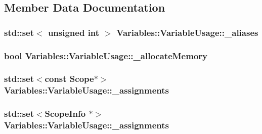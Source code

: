 \subsection{Member Data Documentation}
\hypertarget{class_variables_1_1_variable_usage_affb574d671d4bd26157faac587931e3c}{
\subsubsection[{\-\_\-aliases}]{\setlength{\rightskip}{0pt plus 5cm}std\-::set$<$ unsigned int $>$ Variables\-::\-Variable\-Usage\-::\-\_\-aliases}}\label{class_variables_1_1_variable_usage_affb574d671d4bd26157faac587931e3c}
\hypertarget{class_variables_1_1_variable_usage_a5741213a6dd74bcd1358b288c86bd455}{
\subsubsection[{\-\_\-allocate\-Memory}]{\setlength{\rightskip}{0pt plus 5cm}bool Variables\-::\-Variable\-Usage\-::\-\_\-allocate\-Memory}}\label{class_variables_1_1_variable_usage_a5741213a6dd74bcd1358b288c86bd455}
\hypertarget{class_variables_1_1_variable_usage_afa7089f2e61d22540f2337033ff80ece}{
\subsubsection[{\-\_\-assignments}]{\setlength{\rightskip}{0pt plus 5cm}std\-::set$<$const {\bf Scope}$\ast$$>$ Variables\-::\-Variable\-Usage\-::\-\_\-assignments}}\label{class_variables_1_1_variable_usage_afa7089f2e61d22540f2337033ff80ece}
\hypertarget{class_variables_1_1_variable_usage_ab8ea544aaf7d6bcb483064da497002f0}{
\subsubsection[{\-\_\-assignments}]{\setlength{\rightskip}{0pt plus 5cm}std\-::set$<${\bf Scope\-Info} $\ast$$>$ Variables\-::\-Variable\-Usage\-::\-\_\-assignments}}\label{class_variables_1_1_variable_usage_ab8ea544aaf7d6bcb483064da497002f0}
